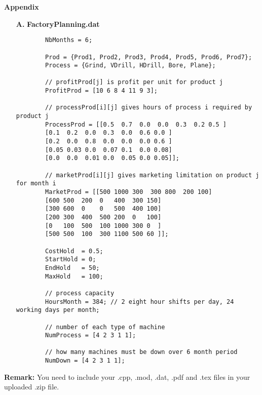 \documentclass[12pt,a4paper]{article}
\theoremstyle{definition}
\begin{document}
{\noindent\large\textbf{Appendix}}
\begin{enumerate}
	\item [\textbf{A.}]
	\textbf{FactoryPlanning.dat}
	\begin{lstlisting}
		NbMonths = 6;
		
		Prod = {Prod1, Prod2, Prod3, Prod4, Prod5, Prod6, Prod7};
		Process = {Grind, VDrill, HDrill, Bore, Plane};
		
		// profitProd[j] is profit per unit for product j
		ProfitProd = [10 6 8 4 11 9 3];
		
		// processProd[i][j] gives hours of process i required by product j
		ProcessProd = [[0.5  0.7  0.0  0.0  0.3  0.2 0.5 ]
		[0.1  0.2  0.0  0.3  0.0  0.6 0.0 ]
		[0.2  0.0  0.8  0.0  0.0  0.0 0.6 ]
		[0.05 0.03 0.0  0.07 0.1  0.0 0.08]
		[0.0  0.0  0.01 0.0  0.05 0.0 0.05]];
		
		// marketProd[i][j] gives marketing limitation on product j for month i
		MarketProd = [[500 1000 300  300 800  200 100]
		[600 500  200  0   400  300 150]
		[300 600  0    0   500  400 100]
		[200 300  400  500 200  0   100]
		[0   100  500  100 1000 300 0  ]
		[500 500  100  300 1100 500 60 ]];
		
		CostHold  = 0.5;
		StartHold = 0;
		EndHold   = 50;
		MaxHold   = 100;
		
		// process capacity
		HoursMonth = 384; // 2 eight hour shifts per day, 24 working days per month;
		
		// number of each type of machine
		NumProcess = [4 2 3 1 1];
		
		// how many machines must be down over 6 month period
		NumDown = [4 2 3 1 1];
	\end{lstlisting}
\end{enumerate}

\textbf{Remark:} You need to include your .cpp, .mod, .dat, .pdf and .tex files in your uploaded .zip file.

\end{document}
